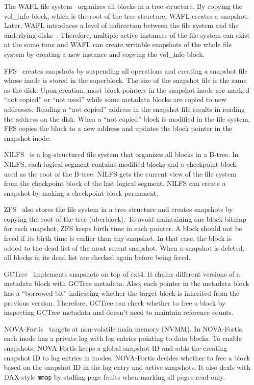 The WAFL file system~\citep{wafl} organizes all blocks in a tree structure.
By copying the vol\_info block, which is the root of the tree structure, WAFL
creates a snapshot.
Later, WAFL introduces a level of indirection between the file system and the
underlying disks~\citep{wafl-flexvol}.
Therefore, multiple active instances of the file system can exist at the same
time and WAFL can create writable snapshots of the whole file system by creating
a new instance and copying the vol\_info block.

FFS~\citep{ffs1,ffs2} creates snapshots by suspending all operations and creating a
snapshot file whose inode is stored in the superblock.
The size of the snapshot file is the same as the disk.
Upon creation, most block pointers in the snapshot inode are marked
``not copied'' or ``not used'' while some metadata blocks are copied to new
addresses.
Reading a ``not copied'' address in the snapshot file results in reading the
address on the disk.
When a ``not copied'' block is modified in the file system, FFS copies the block
to a new address and updates the block pointer in the snapshot inode.

NILFS~\citep{nilfs2} is a log-structured file system that organizes all blocks
in a B-tree.
In NILFS, each logical segment contains modified blocks and a checkpoint block
used as the root of the B-tree.
NILFS gets the current view of the file system from the checkpoint block
of the last logical segment.
NILFS can create a snapshot by making a checkpoint block permanent.

ZFS~\citep{zfs} also stores the file system in a tree structure and creates
snapshots by copying the root of the tree (uberblock).
To avoid maintaining one block bitmap for each snapshot, ZFS keeps birth time
in each pointer.
A block should not be freed if its birth time is earlier than any snapshot.
In that case, the block is added to the dead list of the most recent snapshot.
When a snapshot is deleted, all blocks in its dead list are checked again before
being freed.

GCTree~\citep{gctree} implements snapshots on top of ext4.
It chains different versions of a metadata block with GCTree metadata.
Also, each pointer in the metadata block has a ``borrowed bit'' indicating
whether the target block is inherited from the previous version.
Therefore, GCTree can check whether to free a block by inspecting GCTree
metadata and doesn't need to maintain reference counts.

NOVA-Fortis~\citep{nova} targets at non-volatile main memory (NVMM).
In NOVA-Fortis, each inode has a private log with log entries pointing
to data blocks.
To enable snapshots, NOVA-Fortis keeps a global snapshot ID and adds the
creating snapshot ID to log entries in inodes.
NOVA-Fortis decides whether to free a block based on the snapshot ID in the log
entry and active snapshots.
It also deals with DAX-style \texttt{mmap} by stalling page faults when marking
all pages read-only.

